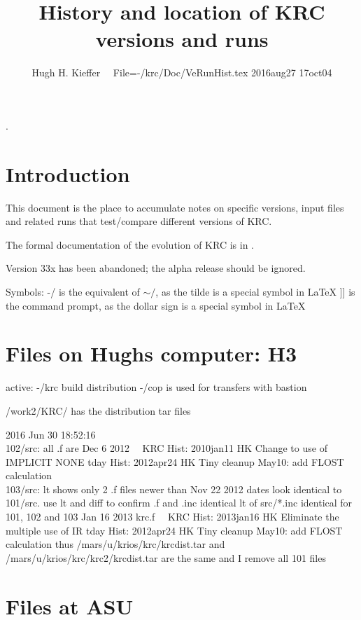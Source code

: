 \documentclass{article}
\title{History and location of KRC versions and runs}
\author{Hugh H. Kieffer  \ \ File=-/krc/Doc/VeRunHist.tex 2016aug27 17oct04}
\begin{document}
\maketitle
\tableofcontents
\hrulefill .\hrulefill

\section{Introduction}

This document is the place to accumulate notes on specific versions, input files and related runs that test/compare different versions of KRC.  

The formal documentation of the evolution of KRC is in  .

Version 33x has been abandoned; the alpha release should be ignored.

Symbols: 
\qi -/ is the equivalent of $\sim /$, as the tilde is a special symbol in LaTeX
\qi ]] is the command prompt, as the dollar sign is a special symbol in LaTeX

\section{Files on Hughs computer: H3}
active: -/krc
build distribution
-/cop is used for transfers with bastion

/work2/KRC/ has the distribution tar files

2016 Jun 30 18:52:16
\\ 102/src:  all .f are Dec  6  2012 \ \  KRC Hist: 2010jan11 HK Change to use of IMPLICIT NONE
\qi tday Hist:  2012apr24  HK  Tiny cleanup  May10: add FLOST calculation
\\ 103/src: lt shows only 2 .f files newer than Nov 22  2012
\qii dates look identical to 101/src. use lt and diff to confirm .f and .inc identical
\qii lt of src/*.inc identical for 101, 102 and 103
 Jan 16  2013 krc.f \ \  KRC Hist: 2013jan16 HK Eliminate the multiple use of IR 
\qi tday Hist:  2012apr24  HK  Tiny cleanup  May10: add FLOST calculation
\qi thus /mars/u/krios/krc/krcdist.tar and /mars/u/krios/krc/krc2/krcdist.tar are the same
\qi and I remove all 101 files


\section{Files at  ASU}
\end{document}
